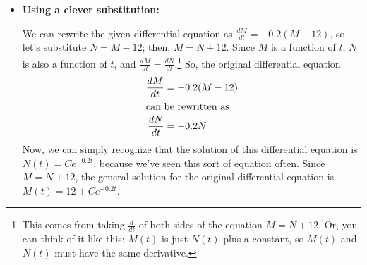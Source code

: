 \documentclass[main]{subfiles}
\begin{document}
\begin{enumerate}
\begin{solution}
\begin{itemize}
    If $M \neq 12$, then $2.4 - 0.2 M \neq 0$, and we can separate to
    get $\frac{1}{2.4 - 0.2 M} \frac{dM}{dt} = 1$.\footnote{If we do this when
    $2.4 - 0.2 M = 0$, we are dividing by 0, which is bad.}  We can
    rewrite this as \[- \frac{1}{0.2} \cdot \frac{1}{M - 12} \frac{dM}{dt} =
    1.\footnote{You don't \textit{have} to simplify like this before
    integrating, but it makes integrating easier!}\] Integrating
    both sides with respect to $t$, we have 
    \[- \frac{1}{0.2} \ln | M - 12| = t + C.\] Multiplying
    both sides by $-0.2$ gives \[\ln | M - 12| = -0.2 t - 0.2 C.\] Since
    $-0.2 C$ is just an arbitrary constant, we can give it a new name;
    let's call it $A$.  So,
    \begin{align*}
    \ln|M - 12| & = A - 0.2 t \\
    e^{\ln |M - 12|} & = e^{A - 0.2 t} \\
    |M - 12| & = e^A e^{-0.2 t} \\
    M - 12 & = \pm e^{A} e^{-0.2 t}
    \end{align*} Again, $\pm e^A$ is just an arbitrary constant, so
    let's call it $B$.\footnote{Since $B = \pm e^A$, $B$ should
    technically be non-zero.}  So, \[M - 12 = B e^{-0.2 t},\] and
    .\footnote{The way we solved this,
    $B$ had to be non-zero.  However, at the very beginning, we
    pointed out that $M(t) = 12$ is a solution.  This solution could
    be written as $M(t) = 12 + B e^{-0.2 t}$ with $B = 0$.  So, in the
    final answer $M(t) = 12 + B e^{-0.2t}$, $B$ really \textit{can} be
    any constant.}

    \item \textbf{Using a clever substitution:}

    We can rewrite the given differential equation as $\frac{dM}{dt} =
    -0.2 (M - 12)$, so let's substitute $N = M - 12$; then, $M = N +
    12$.  Since $M$ is a function of $t$, $N$ is also a function of $t$,
    and $\frac{dM}{dt} = \frac{dN}{dt}$.\footnote{This comes from taking
    $\frac{d}{dt}$ of both sides of the equation $M = N + 12$.  Or,
    you can think of it like this: $M(t)$ is just $N(t)$ plus a
    constant, so $M(t)$ and $N(t)$ must have the same derivative.}
    So, the original differential equation
    \begin{align*}
    \frac{dM}{dt} &= -0.2 (M - 12) \\
    \intertext{can be rewritten as}
    \frac{dN}{dt} &= -0.2 N
    \end{align*}
    Now, we can simply recognize that the solution of this differential
    equation is $N(t) = C e^{-0.2 t}$, because we've seen this sort of
    equation often.  Since $M = N + 12$, the general
    solution for the original differential equation is $M(t) = 12 + C
    e^{-0.2 t}$.
    

\end{itemize}
\end{solution}
\end{enumerate}
\end{document}
